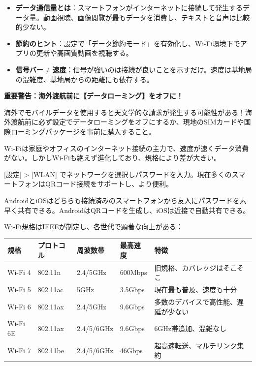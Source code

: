 
\begin{itemize}
  \item \textbf{データ通信量とは}：スマートフォンがインターネットに接続して発生するデータ量。動画視聴、画像閲覧が最もデータを消費し、テキストと音声は比較的少ない。
  \item \textbf{節約のヒント}：設定で「データ節約モード」を有効化し、Wi-Fi環境下でアプリの更新や高画質動画を視聴する。
  \item \textbf{信号バー$\neq$速度}：信号が強いのは接続が良いことを示すだけ。速度は基地局の混雑度、基地局からの距離にも依存する。
\end{itemize}

\textbf{重要警告：海外渡航前に【データローミング】をオフに！}\par

海外でモバイルデータを使用すると天文学的な請求が発生する可能性がある！海外渡航前に必ず設定でデータローミングをオフにするか、現地のSIMカードや国際ローミングパッケージを事前に購入すること。


Wi-Fiは家庭やオフィスのインターネット接続の主力で、速度が速くデータ消費がない。しかしWi-Fiも絶えず進化しており、規格により差が大きい。


[設定] > [WLAN] でネットワークを選択しパスワードを入力。現在多くのスマートフォンはQRコード接続をサポートし、より便利。


AndroidとiOSはどちらも接続済みのスマートフォンから友人にパスワードを素早く共有できる。AndroidはQRコードを生成し、iOSは近接で自動共有できる。


Wi-Fi規格はIEEEが制定し、各世代で顕著な向上がある：

\begin{center}
\begin{tabularx}{\linewidth}{|X|X|X|X|X|}
\hline
\textbf{規格} & \textbf{プロトコル} & \textbf{周波数帯} & \textbf{最高速度} & \textbf{特徴} \tabularnewline
\hline
Wi-Fi 4 & 802.11n & 2.4/5GHz & 600Mbps & 旧規格、カバレッジはそこそこ \tabularnewline
Wi-Fi 5 & 802.11ac & 5GHz & 3.5Gbps & 現在最も普及、速度も十分 \tabularnewline
Wi-Fi 6 & 802.11ax & 2.4/5GHz & 9.6Gbps & 多数のデバイスで高性能、遅延が少ない \tabularnewline
Wi-Fi 6E & 802.11ax & 2.4/5/6GHz & 9.6Gbps & 6GHz帯追加、混雑なし \tabularnewline
Wi-Fi 7 & 802.11be & 2.4/5/6GHz & 46Gbps & 超高速転送、マルチリンク集約 \tabularnewline
\hline
\end{tabularx}
\end{center}

